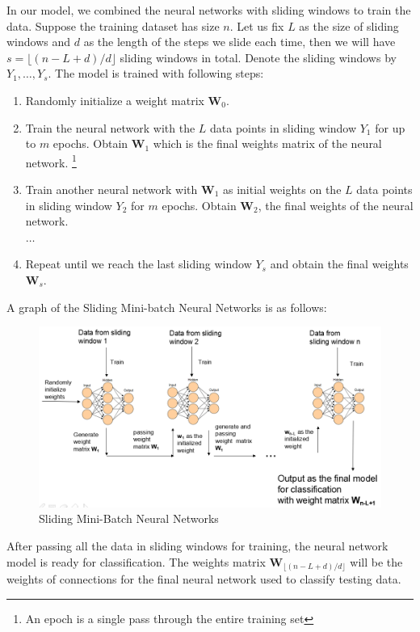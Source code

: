 \documentclass[conference]{IEEEtran}
\begin{document}
		
		In our model, we combined the neural networks with sliding windows to train the data. Suppose the training dataset has size $n$. Let us fix $L$ as the size of sliding windows and $d$ as the length of the steps we slide each time, then we will have $s = \lfloor(n-L+d) / d\rfloor$ sliding windows in total. Denote the sliding windows by $Y_1, \ldots, Y_s$.  The model is trained with following steps: 
		\begin{enumerate}
			\item Randomly initialize a weight matrix $\textbf{W}_0$.
			\item Train the neural network with the $L$ data points in sliding window $Y_1$ for up to $m$ epochs. Obtain $\textbf{W}_1$ which is the final weights matrix of the neural network.
			\footnote{An epoch is a single pass through the entire training set} 
			\item Train another neural network with $\textbf{W}_1$ as initial weights on the $L$ data points in sliding window $Y_2$ for $m$ epochs. Obtain $\textbf{W}_2$, the final weights of the neural network.\\
			$\ldots$
			\item Repeat until we reach the last sliding window $Y_s$ and obtain the final weights $\textbf{W}_{s}$.
		\end{enumerate}
		A graph of the Sliding Mini-batch Neural Networks is as follows:
		\begin{figure}[H]
			\centering
			\includegraphics[width=1\linewidth]{figures/CNN}
			\caption{Sliding Mini-Batch Neural Networks}
			\label{fig:minibatchANN}
		\end{figure}
		After passing all the data in sliding windows for training, the neural network model is ready for classification. The weights matrix $\textbf{W}_{\lfloor(n-L+d) / d\rfloor}$ will be the weights of connections for the final neural network used to classify testing data.
		
\end{document}
